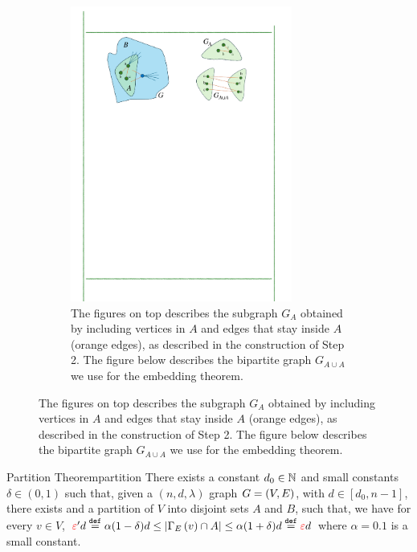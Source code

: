 \documentclass[11pt]{article}
\newcommand{\EnDeeLambda}{(n, d, \lambda)}
\newcommand{\BipartiteG}{G_{A \cup A}}
\newcommand{\EdgesShort}{E}
\begin{document}
\begin{figure}[t!]
\begin{subfigure}[t]{0.45\textwidth}
        \includegraphics[width=0.8\textwidth]{assets/PartitionB.pdf}
        \caption{The figures on top describes the subgraph $G_A$ obtained by including vertices in $A$ and edges that stay inside $A$ (orange edges), as described in the construction of Step 2. The figure below describes the bipartite graph $\BipartiteG$ we use for the embedding theorem.}
        \label{subfig:partitionB}        
    \end{subfigure}
\end{figure}


\begin{theorem}{Partition Theorem}{partition}
There exists a constant $d_0 \in \mathbb{N}$ and small constants $\delta \in (0,1)$ such that, given a $\EnDeeLambda$ graph $G = (V, E)$, with $d \in [d_0, n-1]$, there exists and a partition of $V$ into disjoint sets $A$ and $B$, such that, we have for every $v \in V$, $ \Eps'd \Def \alpha(1-\delta)d\leq |\Neighbourhood{\EdgesShort}{v} \cap A| \leq \alpha(1+\delta)d \Def \Eps d$ where $\alpha=0.1$ is a small constant.

	
\end{theorem}
\end{document}
